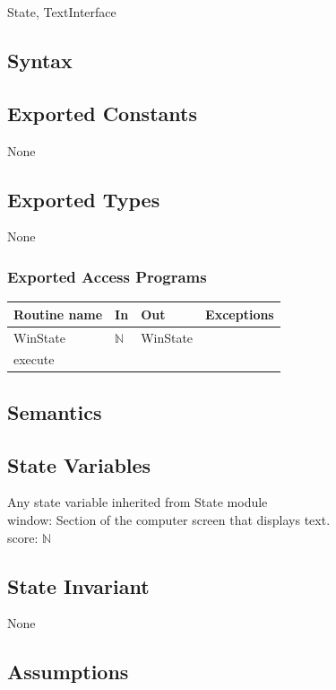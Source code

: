 \documentclass[12pt]{article}
\begin{document}
State, TextInterface

\subsection* {Syntax}

\subsection*{Exported Constants}

None

\subsection*{Exported Types}

None

\subsubsection* {Exported Access Programs}

\begin{tabular}{| l | l | l | p{6cm} |}
\hline
\textbf{Routine name} & \textbf{In} & \textbf{Out} & \textbf{Exceptions}\\
\hline
WinState & $\mathbb{N}$ & WinState & ~ \\
\hline
execute & ~ & ~ & ~ \\
\hline
\end{tabular}

\subsection* {Semantics}

\subsection*{State Variables}

Any state variable inherited from State module\\
window: Section of the computer screen that displays text.\\
score: $\mathbb{N}$

\subsection*{State Invariant}

None

\subsection*{Assumptions}
\end{document}
